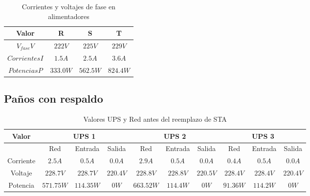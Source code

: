 \documentclass{article}
\begin{document}
\begin{center}
    \begin{table}[H]
        \centering
        \begin{tabular}{c c c c}
            Valor & R & S & T \\\hline
            $V_{fase}V$ & $222 V$ & $225 V$  & $229 V$ \\
            $Corrientes I$ & $1.5 A$  & $2.5 A$  & $3.6 A$ \\
	    $Potencias P$ & $333.0 W$ & $562.5 W$  & $824.4 W$ 
        \end{tabular}
        \caption{Corrientes y voltajes de fase en alimentadores}
        \label{tab:alimentadores}
    \end{table}
\end{center}

\subsection{Paños con respaldo}

\begin{center}
    \begin{table}[H]
        \centering
        \begin{tabular}{c | c c c | c c c | c c c}
            Valor & \multicolumn{3}{c}{UPS 1} & \multicolumn{3}{c}{UPS 2} & \multicolumn{3}{c}{UPS 3}  \\\hline
            & Red & Entrada & Salida & Red & Entrada & Salida & Red & Entrada & Salida \\ 
            Corriente & $2.5 A$ & $0.5 A$ & $0.0 A$ & $2.9 A$ & $0.5 A$ & $0.0 A$ & $0.4 A$ & $0.5 A$ & $0.0 A$\\
            Voltaje & $228.7 V$ & $228.7 V$ & $220.4 V$ & $228.8 V$ & $228.8 V$ & $220.5 V $ & $228.4 V$ & $ 228.4 V$ & $ 220.4 V$ \\ 
            Potencia & $ 571.75 W $ & $114.35 W$ & $0 W$ & $ 663.52 W$ & $114.4 W$ & $0 W$ & $91.36 W$ & $114.2 W$ & $0 W$ \\
        \end{tabular}
        \caption{Valores UPS y Red antes del reemplazo de STA}
        \label{tab:UPSes}
    \end{table}
\end{center}
\end{document}
